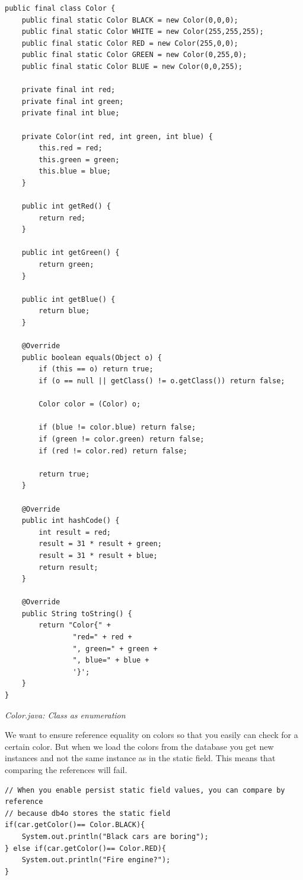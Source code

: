 \begin{lstlisting}
public final class Color {
    public final static Color BLACK = new Color(0,0,0);
    public final static Color WHITE = new Color(255,255,255);
    public final static Color RED = new Color(255,0,0);
    public final static Color GREEN = new Color(0,255,0);
    public final static Color BLUE = new Color(0,0,255);

    private final int red;
    private final int green;
    private final int blue;

    private Color(int red, int green, int blue) {
        this.red = red;
        this.green = green;
        this.blue = blue;
    }

    public int getRed() {
        return red;
    }

    public int getGreen() {
        return green;
    }

    public int getBlue() {
        return blue;
    }

    @Override
    public boolean equals(Object o) {
        if (this == o) return true;
        if (o == null || getClass() != o.getClass()) return false;

        Color color = (Color) o;

        if (blue != color.blue) return false;
        if (green != color.green) return false;
        if (red != color.red) return false;

        return true;
    }

    @Override
    public int hashCode() {
        int result = red;
        result = 31 * result + green;
        result = 31 * result + blue;
        return result;
    }

    @Override
    public String toString() {
        return "Color{" +
                "red=" + red +
                ", green=" + green +
                ", blue=" + blue +
                '}';
    }
}
\end{lstlisting}

{\small\itshape Color.java: Class as enumeration\par}
\medskip

We want to ensure reference equality on colors so that you easily can check for a certain color. But when we load the colors from the database you get new instances and not the same instance as in the static field. This means that comparing the references will fail.

\begin{lstlisting}
// When you enable persist static field values, you can compare by reference
// because db4o stores the static field
if(car.getColor()== Color.BLACK){
    System.out.println("Black cars are boring");
} else if(car.getColor()== Color.RED){
    System.out.println("Fire engine?");
}
\end{lstlisting}

